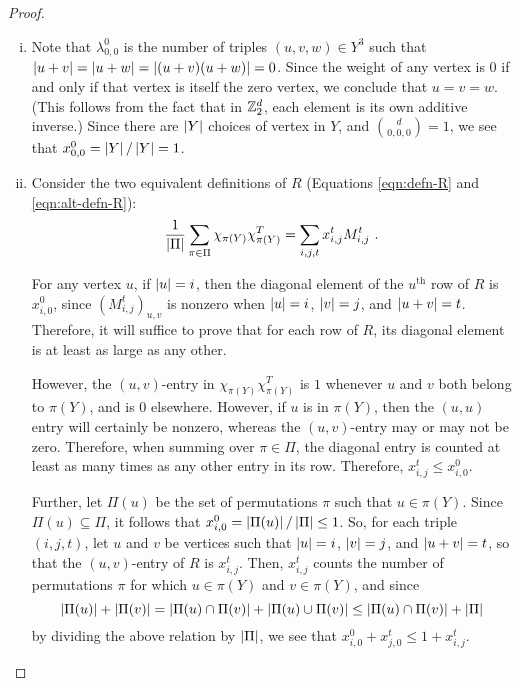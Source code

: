\documentclass{report}
\newcommand{\wt}[1]{\abs{ #1 }}
\newcommand{\xijt}{x_{i, j}^t}
\newcommand{\Mijt}{M_{i, j}^t}
\newcommand{\chipiY}{\chi_{\pi(Y)}}
\begin{document}
    \begin{proof} \begin{enumerate}[(i)]
      \item Note that $\lambda_{0, 0}^0$ is the number of triples $(u, v, w)
        \in Y^3$ such that $\wt{u + v} = \wt{u + w} = \wt{(u + v)(u + w)} =
        0$.  Since the weight of any vertex is $0$ if and only if that vertex
        is itself the zero vertex, we conclude that $u = v = w$.  (This
        follows from the fact that in $\mathbb{Z}_2^d$, each element is its own
        additive inverse.)  Since there are $\left\lvert Y \right\rvert$ choices of vertex in
        $Y$, and $\binom{d}{0, 0, 0} = 1$, we see that $x_{0, 0}^0 = \left\lvert Y \right\rvert /
        \left\lvert Y \right\rvert = 1$.

      \item Consider the two equivalent definitions of $R$ (Equations
        \ref{eqn:defn-R} and \ref{eqn:alt-defn-R}):
        $$
          \frac{1}{\abs{\Pi}} \sum_{\pi \in \Pi} \chipiY \chipiY^T
          = \sum_{i, j, t} \xijt \Mijt \ .
        $$

        For any vertex $u$, if $\wt{u} = i$, then the diagonal element of the
        $u^\text{th}$ row of $R$ is $x_{i, 0}^0$, since $(\Mijt)_{u, v}$ is
        nonzero when $\wt{u} = i$, $\wt{v} = j$, and $\wt{u + v} = t$.
        Therefore, it will suffice to prove that for each row of $R$, its
        diagonal element is at least as large as any other.

        However, the $(u, v)$-entry in $\chipiY \chipiY^T$ is $1$ whenever $u$
        and $v$ both belong to $\pi(Y)$, and is $0$ elsewhere.  However, if $u$
        is in $\pi(Y)$, then the $(u, u)$ entry will certainly be nonzero,
        whereas the $(u, v)$-entry may or may not be zero.  Therefore, when
        summing over $\pi \in \Pi$, the diagonal entry is counted at least as
        many times as any other entry in its row.  Therefore, $\xijt \leq x_{i,
        0}^0$.  

        Further, let $\Pi(u)$ be the set of permutations $\pi$ such that $u \in
        \pi(Y)$.  Since $\Pi(u) \subseteq \Pi$, it follows that $x_{i, 0}^0 =
        \left\lvert \Pi(u) \right\rvert / \left\lvert \Pi \right\rvert \leq 1$.  So, for each triple $(i, j, t)$, let
        $u$ and $v$ be vertices such that $\wt{u} = i$, $\wt{v} = j$, and $\wt{u
        + v} = t$, so that the $(u, v)$-entry of $R$ is $\xijt$.  Then, $\xijt$
        counts the number of permutations $\pi$ for which $u \in \pi(Y)$ and $v
        \in \pi(Y)$, and since
        $$
          \left\lvert \Pi(u) \right\rvert + \left\lvert \Pi(v) \right\rvert
          = \left\lvert \Pi(u) \cap \Pi(v) \right\rvert
          + \left\lvert \Pi(u) \cup \Pi(v) \right\rvert
          \leq \left\lvert \Pi(u) \cap \Pi(v) \right\rvert
          + \left\lvert \Pi \right\rvert
        $$
        by dividing the above relation by $\left\lvert \Pi \right\rvert$, we see that $x_{i, 0}^0 +
        x_{j, 0}^t \leq 1 + \xijt$.


\end{enumerate}
\end{proof}
\end{document}

